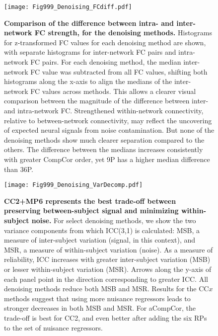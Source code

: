 \documentclass{article}
\begin{document}
\begin{figure}
    \centering
    \texttt{[image: Fig999\_Denoising\_FCdiff.pdf]}
    \caption{\small \textbf{Comparison of the difference between intra- and inter-network FC strength, for the denoising methods.} Histograms for z-transformed FC values for each denoising method are shown, with separate histograms for inter-network FC pairs and intra-network FC pairs. For each denoising method, the median inter-network FC value was subtracted from all FC values, shifting both histograms along the x-axis to align the medians of the inter-network FC values across methods. This allows a clearer visual comparison between the magnitude of the difference between inter- and intra-network FC. Strengthened within-network connectivity, relative to between-network connectivity, may reflect the uncovering of expected neural signals from noise contamination. But none of the denoising methods show much clearer separation compared to the others. The difference between the medians increases consistently with greater CompCor order, yet 9P has a higher median difference than 36P.}
    \label{app:fig:baselineFC_diff}
\end{figure}

\begin{figure}
    \centering
    \texttt{[image: Fig999\_Denoising\_VarDecomp.pdf]}
    \caption{\small \textbf{CC2+MP6 represents the best trade-off between preserving between-subject signal and minimizing within-subject noise.} For select denoising methods, we show the two variance components from which ICC(3,1) is calculated: MSB, a measure of inter-subject variation (signal, in this context), and MSR, a measure of within-subject variation (noise). As a measure of reliability, ICC increases with greater inter-subject variation (MSB) or lesser within-subject variation (MSR). Arrows along the y-axis of each panel point in the direction corresponding to greater ICC. All denoising methods reduce both MSB and MSR. Results for the CC$x$ methods suggest that using more nuisance regressors leads to stronger decreases in both MSB and MSR. For aCompCor, the trade-off is best for CC2, and even better after adding the six RPs to the set of nuisance regressors.}
    \label{app:fig:baselineVarDecomp}
\end{figure}

\end{document}
